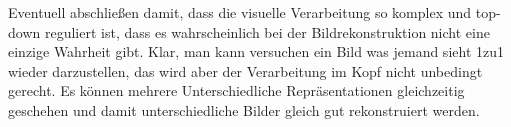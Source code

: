 
Eventuell abschließen damit, dass die visuelle Verarbeitung so komplex und top-down reguliert ist, dass es wahrscheinlich bei der Bildrekonstruktion nicht eine einzige Wahrheit gibt. Klar, man kann versuchen ein Bild was jemand sieht 1zu1 wieder darzustellen, das wird aber der Verarbeitung im Kopf nicht unbedingt gerecht. Es können mehrere Unterschiedliche Repräsentationen gleichzeitig geschehen und damit unterschiedliche Bilder gleich gut rekonstruiert werden. 
